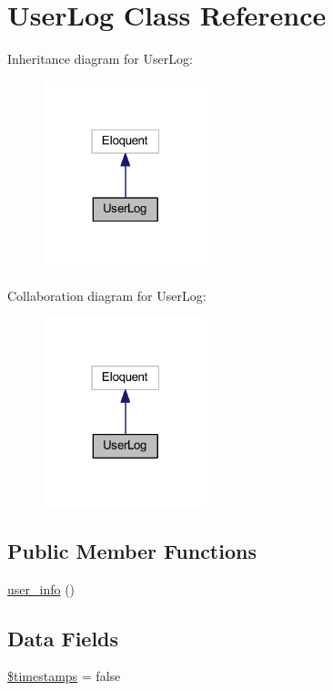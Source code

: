 \hypertarget{class_user_log}{}\section{User\+Log Class Reference}
\label{class_user_log}


Inheritance diagram for User\+Log\+:
\nopagebreak
\begin{figure}[H]
\begin{center}
\leavevmode
\includegraphics[width=135pt]{class_user_log__inherit__graph}
\end{center}
\end{figure}


Collaboration diagram for User\+Log\+:
\nopagebreak
\begin{figure}[H]
\begin{center}
\leavevmode
\includegraphics[width=135pt]{class_user_log__coll__graph}
\end{center}
\end{figure}
\subsection*{Public Member Functions}
\begin{DoxyCompactItemize}
\item 
\hyperlink{class_user_log_aa46b30b943ae2ca7d95ef7957323e119}{user\+\_\+info} ()
\end{DoxyCompactItemize}
\subsection*{Data Fields}
\begin{DoxyCompactItemize}
\item 
\hyperlink{class_user_log_a51267c24c8fae742ed8f9be0ba6085ee}{\$timestamps} = false
\end{DoxyCompactItemize}
